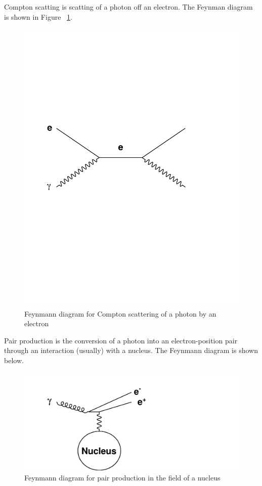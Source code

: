 Compton scatting is scatting of a photon off an electron.  The Feynman diagram is shown in Figure ~\ref{fig:compton}. 


\begin{figure}[h]
\centering\includegraphics[scale=0.5]{./particleinteractions/Pictures/compton.pdf}
\caption{Feynmann diagram for Compton scattering of a photon by an electron}
\label{fig:compton}
\end{figure}

Pair production is the conversion of a photon into an electron-position pair through an interaction (usually) with a nucleus.  The Feynmann diagram is shown below.


\begin{figure}[h]
\centering\includegraphics[scale=0.5]{./particleinteractions/Pictures/pairproduction.pdf}
\caption{Feynmann diagram for pair production in the field of a nucleus}
\label{fig:pairproduction}
\end{figure}



